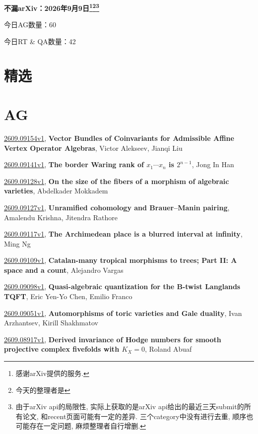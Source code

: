 \documentclass[9pt, a4paper]{article}
\theoremstyle{plain}
\theoremstyle{definition}
\theoremstyle{remark}
\newcommand{\arxiv}[3]{\href{https://arxiv.org/abs/#1}{#1}, \textbf{\textcolor{arxivblue}{#2}}, #3}
\newcommand{\AGnumber}{60}
\newcommand{\RTQAnumber}{42}
\newcommand{\NewestDate}{2026年9月9日}
\newcommand{\todayarXiver}{} %
\begin{document}
\begin{center}
    \Huge\textbf{不漏arXiv：\NewestDate\footnote{感谢arXiv提供的服务.}\footnote{今天的整理者是\todayarXiver}\footnote{由于arXiv api的局限性, 实际上获取的是arXiv api给出的最近三天submit的所有论文, 和recent页面可能有一定的差异. 三个category中没有进行去重, 顺序也可能存在一定问题, 麻烦整理者自行增删.}} \\
\end{center}

\setcounter{section}{-1}

\begin{center}
    今日AG数量：\AGnumber
    
    今日RT \& QA数量：\RTQAnumber
    
\end{center}


\section{精选}


\section{AG}
\arxiv{2609.09154v1}{Vector Bundles of Coinvariants for Admissible Affine Vertex Operator Algebras}{Victor Alekseev, Jianqi Liu}

\arxiv{2609.09141v1}{The border Waring rank of $x_1\cdots x_n$ is $2^{n-1}$}{Jong In Han}

\arxiv{2609.09128v1}{On the size of the fibers of a morphism of algebraic varieties}{Abdelkader Mokkadem}

\arxiv{2609.09127v1}{Unramified cohomology and Brauer--Manin pairing}{Amalendu Krishna, Jitendra Rathore}

\arxiv{2609.09117v1}{The Archimedean place is a blurred interval at infinity}{Ming Ng}

\arxiv{2609.09109v1}{Catalan-many tropical morphisms to trees; Part II: A space and a count}{Alejandro Vargas}

\arxiv{2609.09098v1}{Quasi-algebraic quantization for the B-twist Langlands TQFT}{Eric Yen-Yo Chen, Emilio Franco}

\arxiv{2609.09051v1}{Automorphisms of toric varieties and Gale duality}{Ivan Arzhantsev, Kirill Shakhmatov}

\arxiv{2609.08917v1}{Derived invariance of Hodge numbers for smooth projective complex fivefolds with $K_X = 0$}{Roland Abuaf}
\end{document}
